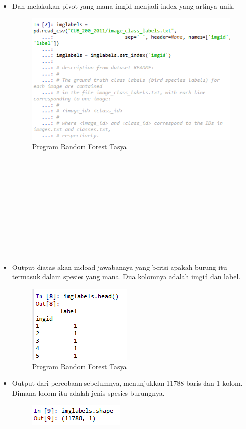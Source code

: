 \begin{itemize}
\item Dan melakukan pivot yang mana imgid menjadi index yang artinya unik.
\begin{figure}[ht]
\centering
\includegraphics[scale=0.3]{figures/rf7.png}
\caption{Program Random Forest Tasya}
\label{Praktek}
\end{figure}
\\
\\
\\
\\
\\
\\
\\
\\
\\
\\
\item Output diatas akan meload jawabannya yang berisi apakah burung itu termasuk dalam spesies yang mana. Dua kolomnya adalah imgid dan label.
\begin{figure}[ht]
\centering
\includegraphics[scale=0.5]{figures/rf8.png}
\caption{Program Random Forest Tasya}
\label{Praktek}
\end{figure}
\item Output dari percobaan sebelumnya, menunjukkan 11788 baris dan 1 kolom. Dimana kolom itu adalah jenis spesies burungnya.
\begin{figure}[ht]
\centering
\includegraphics[scale=0.5]{figures/rf9.png}

\end{figure}
\end{itemize}
